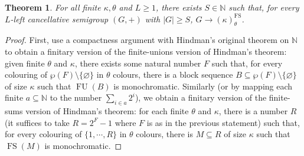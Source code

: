 \documentclass[10pt,a4paper]{amsart}
\newtheorem{theorem}{Theorem}[section]
\theoremstyle{definition}
\theoremstyle{remark}
\numberwithin{equation}{section}
\begin{document}
\begin{theorem}\label{fin-fin-hindman}
    For all finite $\kappa,\theta$ and $L\geq 1$, there exists $S\in\mathbb{N}$ such that, for every $L$-left cancellative semigroup $(G,+)$ with $|G|\geq S$, $G\to (\kappa)_{\theta}^{\operatorname{FS}}$.
\end{theorem}
\begin{proof}
    First, use a compactness argument with Hindman's original theorem on $\mathbb N$ to obtain a finitary version of the finite-unions version of Hindman's theorem: given finite $\theta$ and $\kappa$, there exists some natural number $F$ such that, for every colouring of $\wp(F)\setminus\{\varnothing\}$ in $\theta$ colours, there is a block sequence $B\subseteq\wp(F)\setminus\{\varnothing\}$ of size $\kappa$ such that $\operatorname{FU}(B)$ is monochromatic. Similarly (or by mapping each finite $a\subseteq\mathbb N$ to the number $\sum_{i\in a}2^i$), we obtain a finitary version of the finite-sums version of Hindman's theorem: for each finite $\theta$ and $\kappa$, there is a number $R$ (it suffices to take $R=2^{F}-1$ where $F$ is as in the previous statement) such that, for every colouring of $\{1,\cdots,R\}$ in $\theta$ colours, there is $M\subseteq R$ of size $\kappa$ such that $\operatorname{FS}(M)$ is monochromatic.
    

\end{proof}
\end{document}
